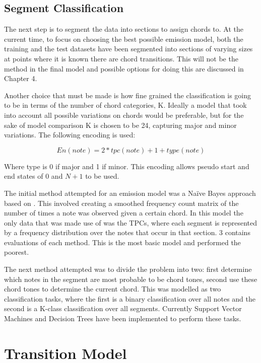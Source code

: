 \documentclass[bsc,singlespacing,parskip,deptreport,twoside,frontabs]{infthesis}
\begin{document}
\subsection{Segment Classification}

The next step is to segment the data into sections to assign chords to. At the current time, to focus on choosing the best possible emission model, both the training and the test datasets have been segmented into sections of varying sizes at points where it is known there are chord transitions. This will not be the method in the final model and possible options for doing this are discussed in Chapter 4.

Another choice that must be made is how fine grained the classification is going to be in terms of the number of chord categories, K. Ideally a model that took into account all possible variations on chords would be preferable, but for the sake of model comparison K is chosen to be 24, capturing major and minor variations. The following encoding is used:

$$
En(note) = 2 * tpc(note) + 1 + type(note)
$$

Where type is 0 if major and 1 if minor. This encoding allows pseudo start and end states of 0 and $N+1$ to be used.

The initial method attempted for an emission model was a Na\"ive Bayes approach based on \cite{mysong}. This involved creating a smoothed frequency count matrix of the number of times a note was observed given a certain chord. In this model the only data that was made use of was the TPCs, where each segment is represented by a frequency distribution over the notes that occur in that section.  3 contains evaluations of each method. This is the most basic model and performed the poorest.

The next method attempted was to divide the problem into two: first determine which notes in the segment are most probable to be chord tones, second use these chord tones to determine the current chord. This was modelled as two classification tasks, where the first is a binary classification over all notes and the second is a K-class classification over all segments. Currently Support Vector Machines and Decision Trees have been implemented to perform these tasks.

\section{Transition Model}
\end{document}
